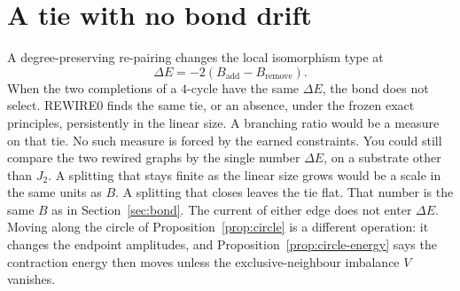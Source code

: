 \section{A tie with no bond drift}
\label{sec:h-rewire}

A degree-preserving re-pairing changes the local isomorphism type at
\[
\Delta E=-2(B_{\mathrm{add}}-B_{\mathrm{remove}}).
\]
When the two completions of a \(4\)-cycle have the same \(\Delta E\), the bond
does not select.
REWIRE0 finds the same tie, or an absence, under the frozen exact principles,
persistently in the linear size.
A branching ratio would be a measure on that tie.
No such measure is forced by the earned constraints.
You could still compare the two rewired graphs by the single number
\(\Delta E\), on a substrate other than \(J_2\).
A splitting that stays finite as the linear size grows would be a scale in
the same units as \(B\).
A splitting that closes leaves the tie flat.
That number is the same \(B\) as in Section~\ref{sec:bond}.
The current of either edge does not enter \(\Delta E\).
Moving along the circle of Proposition~\ref{prop:circle} is a different
operation: it changes the endpoint amplitudes, and
Proposition~\ref{prop:circle-energy} says the contraction energy then
moves unless the exclusive-neighbour imbalance \(V\) vanishes.
